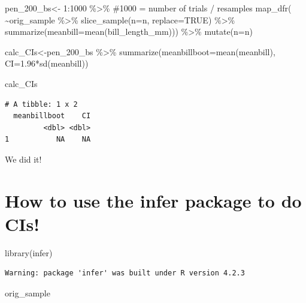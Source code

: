 \documentclass[
  letterpaper,
  DIV=11,
  numbers=noendperiod]{scrartcl}
\newenvironment{Shaded}{\begin{snugshade}}{\end{snugshade}}
\newcommand{\AttributeTok}[1]{\textcolor[rgb]{0.40,0.45,0.13}{#1}}
\newcommand{\CommentTok}[1]{\textcolor[rgb]{0.37,0.37,0.37}{#1}}
\newcommand{\ConstantTok}[1]{\textcolor[rgb]{0.56,0.35,0.01}{#1}}
\newcommand{\DecValTok}[1]{\textcolor[rgb]{0.68,0.00,0.00}{#1}}
\newcommand{\FloatTok}[1]{\textcolor[rgb]{0.68,0.00,0.00}{#1}}
\newcommand{\FunctionTok}[1]{\textcolor[rgb]{0.28,0.35,0.67}{#1}}
\newcommand{\NormalTok}[1]{\textcolor[rgb]{0.00,0.23,0.31}{#1}}
\newcommand{\OtherTok}[1]{\textcolor[rgb]{0.00,0.23,0.31}{#1}}
\newcommand{\SpecialCharTok}[1]{\textcolor[rgb]{0.37,0.37,0.37}{#1}}
\begin{document}
\begin{Shaded}
\begin{Highlighting}[]
\NormalTok{pen\_200\_bs}\OtherTok{\textless{}{-}} \DecValTok{1}\SpecialCharTok{:}\DecValTok{1000} \SpecialCharTok{\%\textgreater{}\%} \CommentTok{\#1000 = number of trials / resamples}
  \FunctionTok{map\_dfr}\NormalTok{(}
    \SpecialCharTok{\textasciitilde{}}\NormalTok{orig\_sample }\SpecialCharTok{\%\textgreater{}\%}
      \FunctionTok{slice\_sample}\NormalTok{(}\AttributeTok{n=}\NormalTok{n, }\AttributeTok{replace=}\ConstantTok{TRUE}\NormalTok{) }\SpecialCharTok{\%\textgreater{}\%}
      \FunctionTok{summarize}\NormalTok{(}\AttributeTok{meanbill=}\FunctionTok{mean}\NormalTok{(bill\_length\_mm))) }\SpecialCharTok{\%\textgreater{}\%}
  \FunctionTok{mutate}\NormalTok{(}\AttributeTok{n=}\NormalTok{n)}

\NormalTok{calc\_CIs}\OtherTok{\textless{}{-}}\NormalTok{pen\_200\_bs }\SpecialCharTok{\%\textgreater{}\%}
  \FunctionTok{summarize}\NormalTok{(}\AttributeTok{meanbillboot=}\FunctionTok{mean}\NormalTok{(meanbill), }\AttributeTok{CI=}\FloatTok{1.96}\SpecialCharTok{*}\FunctionTok{sd}\NormalTok{(meanbill))}

\NormalTok{calc\_CIs}
\end{Highlighting}
\end{Shaded}

\begin{verbatim}
# A tibble: 1 x 2
  meanbillboot    CI
         <dbl> <dbl>
1           NA    NA
\end{verbatim}

We did it!

\hypertarget{how-to-use-the-infer-package-to-do-cis}{%
\section{How to use the infer package to do
CIs!}\label{how-to-use-the-infer-package-to-do-cis}}

\begin{Shaded}
\begin{Highlighting}[]
\FunctionTok{library}\NormalTok{(infer)}
\end{Highlighting}
\end{Shaded}

\begin{verbatim}
Warning: package 'infer' was built under R version 4.2.3
\end{verbatim}

\begin{Shaded}
\begin{Highlighting}[]
\NormalTok{orig\_sample}
\end{Highlighting}
\end{Shaded}
\end{document}

